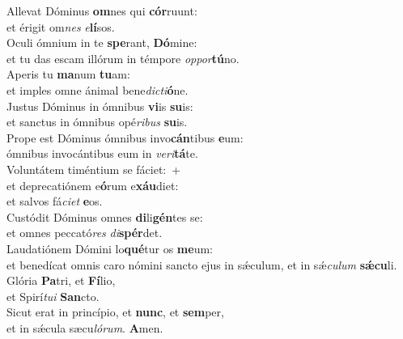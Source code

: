 \evenverse Allevat Dóminus \textbf{om}nes qui \textbf{cór}ruunt:~\*\\
\evenverse et érigit om\textit{nes} \textit{e}\textbf{lí}sos.\\
\oddverse Oculi ómnium in te \textbf{spe}rant, \textbf{Dó}mine:~\*\\
\oddverse et tu das escam illórum in témpore \textit{op}\textit{por}\textbf{tú}no.\\
\evenverse Aperis tu \textbf{ma}num \textbf{tu}am:~\*\\
\evenverse et imples omne ánimal bene\textit{di}\textit{cti}\textbf{ó}ne.\\
\oddverse Justus Dóminus in ómnibus \textbf{vi}is \textbf{su}is:~\*\\
\oddverse et sanctus in ómnibus opé\textit{ri}\textit{bus} \textbf{su}is.\\
\evenverse Prope est Dóminus ómnibus invo\textbf{cán}tibus \textbf{e}um:~\*\\
\evenverse ómnibus invocántibus eum in \textit{ve}\textit{ri}\textbf{tá}te.\\
\oddverse Voluntátem timéntium se fáciet:~+\\
\oddverse  et deprecatiónem e\textbf{ó}rum e\textbf{xáu}diet:~\*\\
\oddverse et salvos fá\textit{ci}\textit{et} \textbf{e}os.\\
\evenverse Custódit Dóminus omnes \textbf{di}li\textbf{gén}tes se:~\*\\
\evenverse et omnes peccató\textit{res} \textit{di}\textbf{spér}det.\\
\oddverse Laudatiónem Dómini lo\textbf{qué}tur os \textbf{me}um:~\*\\
\oddverse et benedícat omnis caro nómini sancto ejus in sǽculum, et in sǽ\textit{cu}\textit{lum} \textbf{sǽ}\textbf{cu}li.\\
\evenverse Glória \textbf{Pa}tri, et \textbf{Fí}lio,~\*\\
\evenverse et Spirí\textit{tu}\textit{i} \textbf{San}cto.\\
\oddverse Sicut erat in princípio, et \textbf{nunc}, et \textbf{sem}per,~\*\\
\oddverse et in sǽcula sæcu\textit{ló}\textit{rum}. \textbf{A}men.\\
